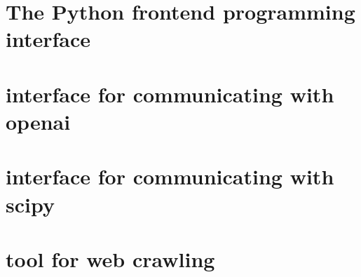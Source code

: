   \section*{The Python frontend programming interface}

  \section*{interface for communicating with openai}
  \section*{interface for communicating with scipy}
  \section*{tool for web crawling}

